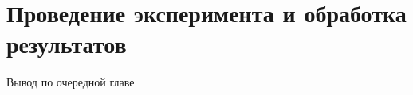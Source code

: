 \chapter{Проведение эксперимента и обработка результатов}





\chapterconclusion

Вывод по очередной главе